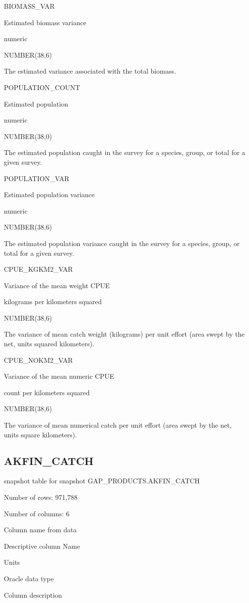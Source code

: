 \documentclass[
  letterpaper,
  oneside,
  open=any]{scrbook}
\begin{document}
BIOMASS\_VAR

Estimated biomass variance

numeric

NUMBER(38,6)

The estimated variance associated with the total biomass.

POPULATION\_COUNT

Estimated population

numeric

NUMBER(38,0)

The estimated population caught in the survey for a species, group, or
total for a given survey.

POPULATION\_VAR

Estimated population variance

numeric

NUMBER(38,6)

The estimated population variance caught in the survey for a species,
group, or total for a given survey.

CPUE\_KGKM2\_VAR

Variance of the mean weight CPUE

kilograms per kilometers squared

NUMBER(38,6)

The variance of mean catch weight (kilograms) per unit effort (area
swept by the net, units squared kilometers).

CPUE\_NOKM2\_VAR

Variance of the mean numeric CPUE

count per kilometers squared

NUMBER(38,6)

The variance of mean numerical catch per unit effort (area swept by the
net, units square kilometers).

\subsection{AKFIN\_CATCH}\label{akfin_catch}

snapshot table for snapshot GAP\_PRODUCTS.AKFIN\_CATCH

Number of rows: 971,788

Number of columns: 6

Column name from data

Descriptive column Name

Units

Oracle data type

Column description
\end{document}
